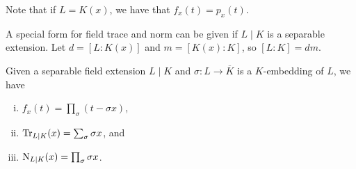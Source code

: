 Note that if $L=K(x)$, we have that $f_x(t)=p_x(t)$.


A special form for field trace and norm can be given if $L\mid K$ is a separable extension. Let $d=[L:K(x)]$ and $m=[K(x):K]$, so $[L:K]=dm$.

\begin{prop}
	Given a separable field extension $L\mid K$ and $\sigma : L\to\overline{K}$ is a $K$-embedding of $L$, we have
	\begin{enumerate}[(i)]
		\item $f_x(t)= \prod_\sigma(t-\sigma x)$,
		\item $\operatorname{Tr}_{L\mid K}(x) = \sum_\sigma \sigma x$, and
		\item $\operatorname{N}_{L\mid K}(x) = \prod_\sigma \sigma x$.
	\end{enumerate}
\end{prop}
